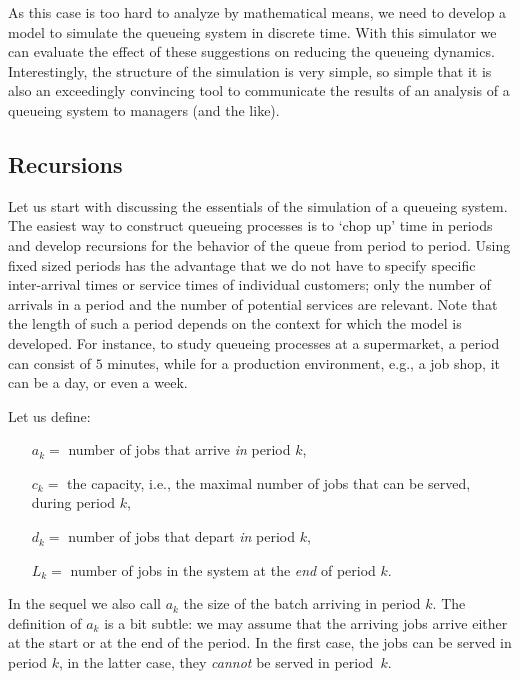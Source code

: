 As this case is too hard to analyze by mathematical means,  we need to develop a model to simulate the queueing system in discrete time. 
With this simulator we can evaluate the effect of these suggestions on reducing the queueing dynamics.
Interestingly, the structure of the simulation is very simple, so simple that it is also an exceedingly convincing tool to communicate the results of an analysis of a queueing system to managers (and the like).

\subsection*{Recursions}

Let us start with discussing the essentials of the simulation of a queueing system.
The easiest way to construct queueing processes is to `chop up' time in periods and develop recursions for the behavior of the queue from period to period.
Using fixed sized periods has the advantage that we do not have to specify specific inter-arrival times or service times of individual customers; only the number of arrivals in a period and the number of potential services are relevant.
Note that the length of such a period depends on the context for which the model is developed.
For instance, to study queueing processes at a supermarket, a period can consist of $5$ minutes, while for a production environment, e.g., a job shop, it can be a day, or even a week.


Let us define:
\begin{itemize}
    \item[$a_k =$] number of jobs that arrive \textit{in} period $k$,
    \item[$c_k= $] the capacity, i.e., the maximal number of jobs that can be served, during period $k$,
    \item[$d_k =$] number of jobs that depart \textit{in} period $k$,
    \item[$L_k =$] number of jobs in the system at the \textit{end} of period $k$.
\end{itemize}
In the sequel we also call $a_k$ the size of the batch arriving in period $k$.
The definition of $a_k$ is a bit subtle: we may assume that the arriving jobs arrive either at the start or at the end of the period.
In the first case, the jobs can be served in period $k$, in the latter case, they \emph{cannot} be served in period~$k$.


